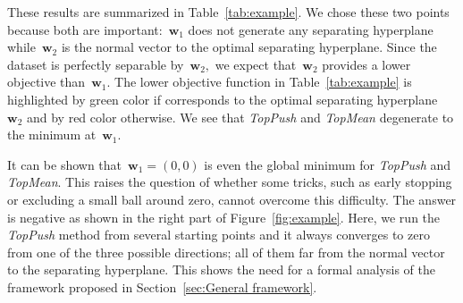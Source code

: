 \documentclass[11pt,a4paper]{article}
\theoremstyle{definition}
\newcommand{\toppush}{\textit{TopPush}\xspace}
\newcommand{\topmean}{\textit{TopMean}\xspace}
\begin{document}
These results are summarized in Table~\ref{tab:example}. We chose these two points because both are important:~$\bm{w}_1$ does not generate any separating hyperplane while~$\bm{w}_2$ is the normal vector to the optimal separating hyperplane. Since the dataset is perfectly separable by~$\bm{w}_2,$ we expect that~$\bm{w}_2$ provides a lower objective than~$\bm{w}_1.$ The lower objective function in Table~\ref{tab:example} is highlighted by green color if corresponds to the optimal separating hyperplane~$\bm{w}_2$ and by red color otherwise. We see that \toppush and \topmean degenerate to the minimum at~$\bm{w}_1.$

It can be shown that~$\bm{w}_1=(0,0)$ is even the global minimum for \toppush and \topmean. This raises the question of whether some tricks, such as early stopping or excluding a small ball around zero, cannot overcome this difficulty. The answer is negative as shown in the right part of Figure~\ref{fig:example}. Here, we run the \toppush method from several starting points and it always converges to zero from one of the three possible directions; all of them far from the normal vector to the separating hyperplane. This shows the need for a formal analysis of the framework proposed in Section~\ref{sec:General framework}.
\end{document}
